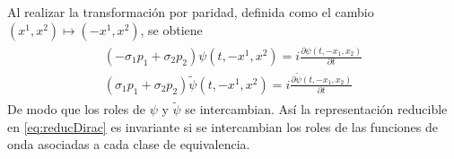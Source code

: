 Al realizar la transformación por paridad, definida como el cambio $(x^1, x^2)\mapsto(-x^1,x^2)$, se obtiene
\begin{align}
	\begin{split}
		(-\sigma_1 p_1 + \sigma_2 p_2)\psi(t,-x^1,x^2) = i\frac{\partial \psi(t,-x_1,x_2)}{\partial t} \\
		(\sigma_1 p_1 + \sigma_2 p_2) \widetilde{\psi}(t,-x^1,x^2) = i\frac{\partial \widetilde{\psi}(t,-x_1,x_2)}{\partial t}
	\end{split}
\end{align}
De modo que los roles de $\psi$ y $\widetilde{\psi}$ se intercambian. Así la representación reducible en \eqref{eq:reducDirac} es invariante si se intercambian los roles de las funciones de onda asociadas a cada clase de equivalencia.
